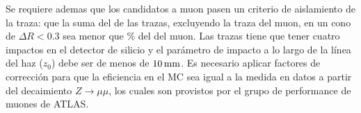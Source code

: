 
Se requiere ademas que los candidatos a muon pasen un criterio de aislamiento de
la traza: que la suma del {\pt} de las trazas, excluyendo la traza del muon, en
un cono de $\Delta R < 0.3$ sea menor que \unit[12]{\%} del {\pt} del muon. Las
trazas tiene que tener cuatro impactos en el detector de silicio y el parámetro
de impacto a lo largo de la línea del haz ($z_{0}$) debe ser de menos de
$\unit[10]{mm}$.
Es necesario aplicar factores de corrección para que la eficiencia en el MC
sea igual a la medida en datos a partir del decaimiento $Z\to\mu\mu$, los
cuales son provistos por el grupo de performance de muones de ATLAS.



